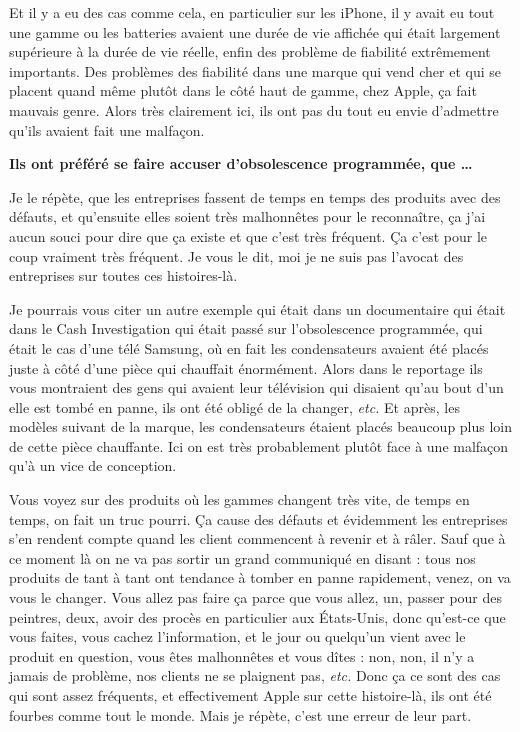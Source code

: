 \begin{small}
Et il y a eu des cas comme cela, en particulier sur les iPhone, il y avait eu tout une gamme ou les batteries avaient une durée de vie affichée qui était largement supérieure à la durée de vie réelle, enfin des problème de fiabilité extrêmement importants. Des problèmes des fiabilité dans une marque qui vend cher et qui se placent quand même plutôt dans le côté haut de gamme, chez Apple, ça fait mauvais genre. Alors très clairement ici, ils ont pas du tout eu envie d'admettre qu'ils avaient fait une malfaçon.

\textbf{Ils ont préféré se faire accuser d'obsolescence programmée, que \dots}
\smallbreak


Je le répète, que les entreprises fassent de temps en temps des produits avec des défauts, et qu'ensuite elles soient très malhonnêtes pour le reconnaître, ça j'ai aucun souci pour dire que ça existe et que c'est très fréquent. Ça c'est pour le coup vraiment très fréquent. Je vous le dit, moi je ne suis pas l'avocat des entreprises sur toutes ces histoires-là.

Je pourrais vous citer un autre exemple qui était dans un documentaire qui était dans le Cash Investigation qui était passé sur l'obsolescence programmée, qui était le cas d'une télé Samsung, où en fait les condensateurs avaient été placés juste à côté d'une pièce qui chauffait énormément. Alors dans le reportage ils vous montraient des gens qui avaient leur télévision qui disaient qu'au bout d'un elle est tombé en panne, ils ont été obligé de la changer, \textit{etc.} Et après, les modèles suivant de la marque, les condensateurs étaient placés beaucoup plus loin de cette pièce chauffante. Ici on est très probablement plutôt face à une malfaçon qu'à un vice de conception. 

Vous voyez sur des produits où les gammes changent très vite, de temps en temps, on fait un truc pourri. Ça cause des défauts et évidemment les entreprises s'en rendent compte quand les client commencent à revenir et à râler. Sauf que à ce moment là on ne va pas sortir un grand communiqué en disant : tous nos produits de tant à tant ont tendance à tomber en panne rapidement, venez, on va vous le changer. Vous allez pas faire ça parce que vous allez, un, passer pour des \og peintres\fg{}, deux, avoir des procès en particulier aux États-Unis, donc qu'est-ce que vous faites, vous cachez l'information, et le jour ou quelqu'un vient avec le produit en question, vous êtes malhonnêtes et vous dîtes : non, non, il n'y a jamais de problème, nos clients ne se plaignent pas, \textit{etc.} Donc ça ce sont des cas qui sont assez fréquents, et effectivement Apple sur cette histoire-là, ils ont été fourbes comme tout le monde. Mais je répète, c'est une erreur de leur part. 


\end{small}
